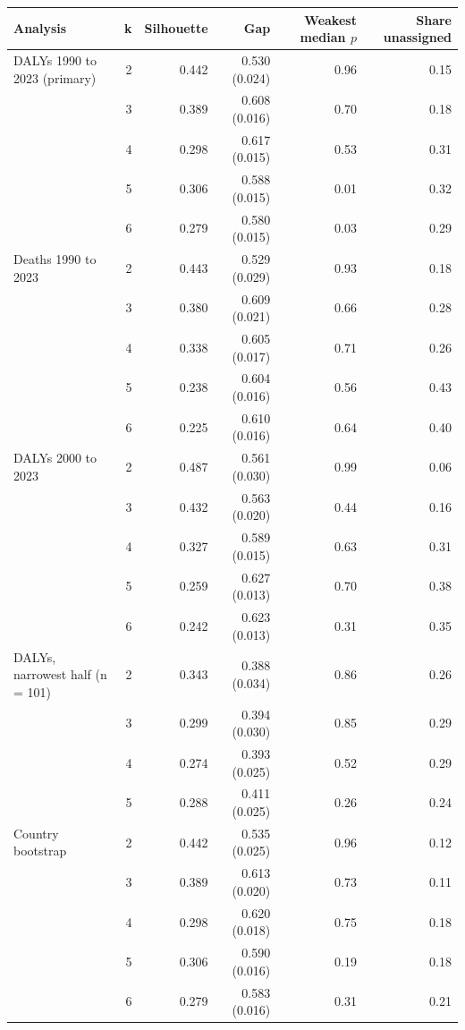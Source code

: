 \begin{tabular}{lrrrrr}
\toprule
Analysis & k & Silhouette & Gap & Weakest median $p$ & Share unassigned \\
\midrule
DALYs 1990 to 2023 (primary) & 2 & 0.442 & 0.530 (0.024) & 0.96 & 0.15 \\
 & 3 & 0.389 & 0.608 (0.016) & 0.70 & 0.18 \\
 & 4 & 0.298 & 0.617 (0.015) & 0.53 & 0.31 \\
 & 5 & 0.306 & 0.588 (0.015) & 0.01 & 0.32 \\
 & 6 & 0.279 & 0.580 (0.015) & 0.03 & 0.29 \\
Deaths 1990 to 2023 & 2 & 0.443 & 0.529 (0.029) & 0.93 & 0.18 \\
 & 3 & 0.380 & 0.609 (0.021) & 0.66 & 0.28 \\
 & 4 & 0.338 & 0.605 (0.017) & 0.71 & 0.26 \\
 & 5 & 0.238 & 0.604 (0.016) & 0.56 & 0.43 \\
 & 6 & 0.225 & 0.610 (0.016) & 0.64 & 0.40 \\
DALYs 2000 to 2023 & 2 & 0.487 & 0.561 (0.030) & 0.99 & 0.06 \\
 & 3 & 0.432 & 0.563 (0.020) & 0.44 & 0.16 \\
 & 4 & 0.327 & 0.589 (0.015) & 0.63 & 0.31 \\
 & 5 & 0.259 & 0.627 (0.013) & 0.70 & 0.38 \\
 & 6 & 0.242 & 0.623 (0.013) & 0.31 & 0.35 \\
DALYs, narrowest half (n = 101) & 2 & 0.343 & 0.388 (0.034) & 0.86 & 0.26 \\
 & 3 & 0.299 & 0.394 (0.030) & 0.85 & 0.29 \\
 & 4 & 0.274 & 0.393 (0.025) & 0.52 & 0.29 \\
 & 5 & 0.288 & 0.411 (0.025) & 0.26 & 0.24 \\
Country bootstrap & 2 & 0.442 & 0.535 (0.025) & 0.96 & 0.12 \\
 & 3 & 0.389 & 0.613 (0.020) & 0.73 & 0.11 \\
 & 4 & 0.298 & 0.620 (0.018) & 0.75 & 0.18 \\
 & 5 & 0.306 & 0.590 (0.016) & 0.19 & 0.18 \\
 & 6 & 0.279 & 0.583 (0.016) & 0.31 & 0.21 \\
\bottomrule
\end{tabular}
